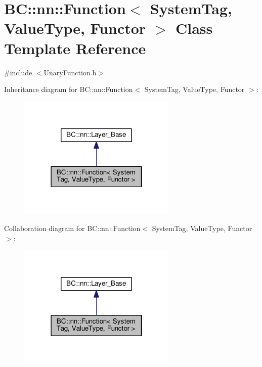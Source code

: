 \hypertarget{classBC_1_1nn_1_1Function}{}\section{BC\+:\+:nn\+:\+:Function$<$ System\+Tag, Value\+Type, Functor $>$ Class Template Reference}
\label{classBC_1_1nn_1_1Function}


{\ttfamily \#include $<$Unary\+Function.\+h$>$}



Inheritance diagram for BC\+:\+:nn\+:\+:Function$<$ System\+Tag, Value\+Type, Functor $>$\+:
\nopagebreak
\begin{figure}[H]
\begin{center}
\leavevmode
\includegraphics[width=214pt]{classBC_1_1nn_1_1Function__inherit__graph}
\end{center}
\end{figure}


Collaboration diagram for BC\+:\+:nn\+:\+:Function$<$ System\+Tag, Value\+Type, Functor $>$\+:
\nopagebreak
\begin{figure}[H]
\begin{center}
\leavevmode
\includegraphics[width=214pt]{classBC_1_1nn_1_1Function__coll__graph}
\end{center}
\end{figure}
